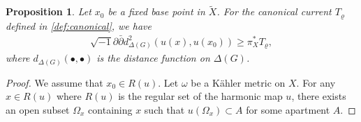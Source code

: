 \documentclass[11pt,a4paper,english]{smfart}
\theoremstyle{plain}
\newtheorem{proposition}[theorem]{Proposition}
\theoremstyle{definition}
\theoremstyle{plain}
\def\hess{\sqrt{-1}\partial\bar{\partial}}
\begin{document}
	\begin{proposition}\label{lem:equal}
Let $x_0$ be a fixed base point in $\widetilde{X}$. For the canonical current $T_\varrho$ defined in \cref{def:canonical}, we have
	\begin{align}\label{eq:equal} 
 \hess d^2_{\Delta(G)}(u(x),u(x_0)) \geq\pi_X^*T_\varrho,
	\end{align} 
	where $d_{\Delta(G)}(\bullet,\bullet)$ is the distance function on $\Delta(G)$. 
\end{proposition}
\begin{proof}
We assume that $x_0\in R(u)$.  Let $\omega$ be a K\"ahler metric on $X$. 	For any $x\in R(u)$ where $R(u)$ is the regular set of the harmonic map $u$, there exists  an open subset $\Omega_{x}$ containing $x$ such that $u(\Omega_{x})\subset A$ for some apartment $A$. 
	

\end{proof}
\end{document}
